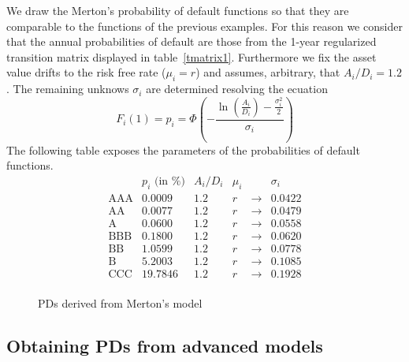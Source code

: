 \documentclass[11pt,fleqn]{book} %
\begin{document}
\begin{example}
	\label{ex:pdfmm}
	We draw the Merton's probability of default functions so that they are 
	comparable to the functions of the previous examples. For this reason
	we consider that the annual probabilities of default are those from the 
	1-year regularized transition matrix displayed in table~\ref{tmatrix1}. 
	Furthermore we fix the asset value drifts to the risk free rate ($\mu_i=r$) 
	and assumes, arbitrary, that $A_i/D_i = 1.2$. The remaining unknows 
	$\sigma_i$ are determined resolving the ecuation
	\begin{displaymath}
		F_i(1) = p_i = \Phi\left( -\frac{\ln\left(\frac{A_i}{D_i} \right)  
		-\frac{\sigma_{i}^2}{2}}{\sigma_{i}}\right)
	\end{displaymath}
	The following table exposes the parameters of the probabilities of default
	functions.
	\begin{displaymath}
		\begin{array}{c|ccccc}
			          &    p_i\text{ (in \%)}  & A_i/D_i &  \mu_i & & \sigma_i \\
			\hline
			\text{AAA} &  0.0009 &   1.2   &   r    & \to & 0.0422 \\
			\text{AA}  &  0.0077 &   1.2   &   r    & \to & 0.0479 \\
			\text{A}   &  0.0600 &   1.2   &   r    & \to & 0.0558 \\
			\text{BBB} &  0.1800 &   1.2   &   r    & \to & 0.0620 \\
			\text{BB}  &  1.0599 &   1.2   &   r    & \to & 0.0778 \\
			\text{B}   &  5.2003 &   1.2   &   r    & \to & 0.1085 \\
			\text{CCC} & 19.7846 &   1.2   &   r    & \to & 0.1928 \\
		\end{array}
	\end{displaymath}
\end{example}

\begin{figure}[!ht]
	\centering
	\caption{PDs derived from Merton's model}
	\label{fig:pdfmm}
\end{figure}

\subsection{Obtaining PDs from advanced models}
\end{document}
